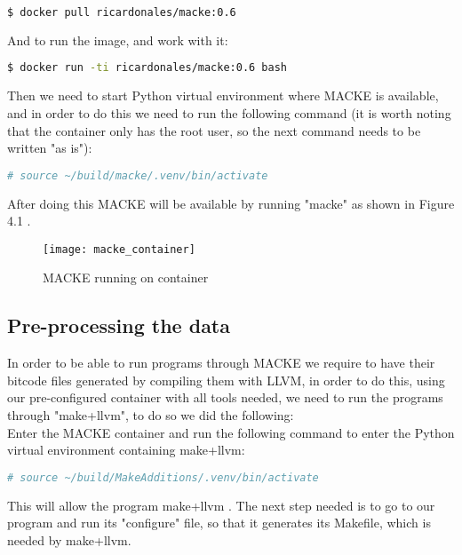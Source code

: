 \begin{lstlisting}[language=bash]
$ docker pull ricardonales/macke:0.6
\end{lstlisting}

And to run the image, and work with it:

\begin{lstlisting}[language=bash]
$ docker run -ti ricardonales/macke:0.6 bash
\end{lstlisting}

Then we need to start Python virtual environment where MACKE is available, and in order to do this we need to run the following command (it is worth noting that the container only has the root user, so the next command needs to be written "as is"):

\begin{lstlisting}[language=bash]
# source ~/build/macke/.venv/bin/activate
\end{lstlisting}

After doing this MACKE will be available by running "macke" as shown in Figure 4.1 .

\begin{figure}[H]
	\caption{MACKE running on container}
	\centering
	\texttt{[image: macke\_container]}
\end{figure}


\subsection{Pre-processing the data}

In order to be able to run programs through MACKE we require to have their bitcode files generated by compiling them with LLVM, in order to do this, using our pre-configured container with all tools needed, we need to run the programs through "make+llvm", to do so we did the following:
\\

Enter the MACKE container and run the following command to enter the Python virtual environment containing make+llvm:

\begin{lstlisting}[language=bash]
# source ~/build/MakeAdditions/.venv/bin/activate
\end{lstlisting}

This will allow the program make+llvm \parencite{thomasThesis} . The next step needed is to go to our program and run its "configure" file, so that it generates its Makefile, which is needed by make+llvm.

